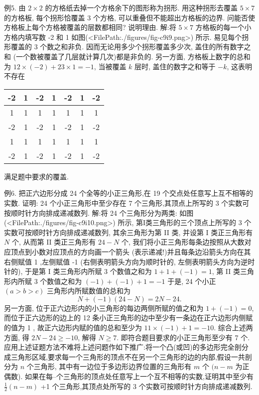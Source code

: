 例5. 由 $2 \times 2$ 的方格纸去掉一个方格余下的图形称为拐形.
用这种拐形去覆盖 $5 \times 7$ 的方格板, 每个拐形恰覆盖 3 个方格, 可以重叠但不能超出方格板的边界.
问能否使方格板上每个方格被覆盖的层数都相同? 说明理由.
解:将 $5 \times 7$ 方格板的每一个小方格内填写数 -2 和 1 如图(<FilePath:./figures/fig-c9i9.png>) 所示.
易见每个拐形覆盖的 3 个数之和非负.
因而无论用多少个拐形覆盖多少次, 盖住的所有数字之和 (一个数被覆盖了几层就计算几次)都是非负的.
另一方面, 方格板上数字的总和为 $12 \times(-2)+23 \times 1=-1$, 当被覆盖 $k$ 层时, 盖住的数字之和等于 $-k$, 这表明不存在
\begin{tabular}{|c|c|c|c|c|c|c|}
\hline-2 & 1 & -2 & 1 & -2 & 1 & -2 \\
\hline 1 & 1 & 1 & 1 & 1 & 1 & 1 \\
\hline-2 & 1 & -2 & 1 & -2 & 1 & -2 \\
\hline 1 & 1 & 1 & 1 & 1 & 1 & 1 \\
\hline-2 & 1 & -2 & 1 & -2 & 1 & -2 \\
\hline
\end{tabular}
满足题中要求的覆盖.



例6. 把正六边形分成 24 个全等的小正三角形,在 19 个交点处任意写上互不相等的实数.
证明: 24 个小正三角形中至少存在 7 个三角形,其顶点上所写的 3 个实数可按顺时针方向排成递减数列.
解:将 24 个三角形分为两类: 如图(<FilePath:./figures/fig-c9i10.png>) 所示, 第I类三角形的三个顶点上所写的 3 个实数可按顺时针方向排成递减数列, 其余三角形为第 II 类, 并设第 I 类正三角形有 $N$ 个, 从而第 II 类正三角形有 $24-N$ 个, 我们将小正三角形每条边按照从大数对应顶点到小数对应顶点的方向画一个箭头 (表示递减!)并且每条边沿箭头方向在其右侧赋值 1 ,左侧赋值 -1 (右侧表明箭头方向为顺时针的, 左侧表明箭头方向为逆时针的), 于是第 I 类三角形内所赋 3 个数值之和为 $1+1+(-1)=1$, 第 II 类三角形内所赋 3 个数值之和为 $(-1)+(-1)+1=-1$ 于是, 24 个小正 $(a>b>c)$ 三角形内所赋数值的总和为
$$
N+(-1)(24-N)=2 N-24 .
$$
另一方面, 位于正六边形内的小三角形的每边两侧所赋的值之和为 $1+ (-1)=0$, 而位于正六边形的边上的 12 条小正三角形的边中至少有一条边在正六边形内侧赋的值为 1 , 故正六边形内赋的值的总和至少为 $11 \times(-1)+ 1=-10$.
综合上述两方面, 得 $2 N-24 \geqslant-10$, 解得 $N \geqslant 7$. 即符合题目要求的小正三角形至少有 7 个.
应用上述证题方法不难将上述问题作如下推广:将一个凸(或凹)的多边形完全剖分成三角形区域,要求每一个三角形的顶点不在另一个三角形的边的内部,假设一共剖分为 $n$ 个三角形, 其中有一边位于多边形边界位置的三角形有 $m$ 个 $(n-m$ 为正偶数). 如果在每--个三角形的顶点处任意写上一个互不相等的实数,证明其中至少有 $\frac{1}{2}(n-m)$ +1 个三角形,其顶点处所写的 3 个实数可按顺时针方向排成递减数列.




